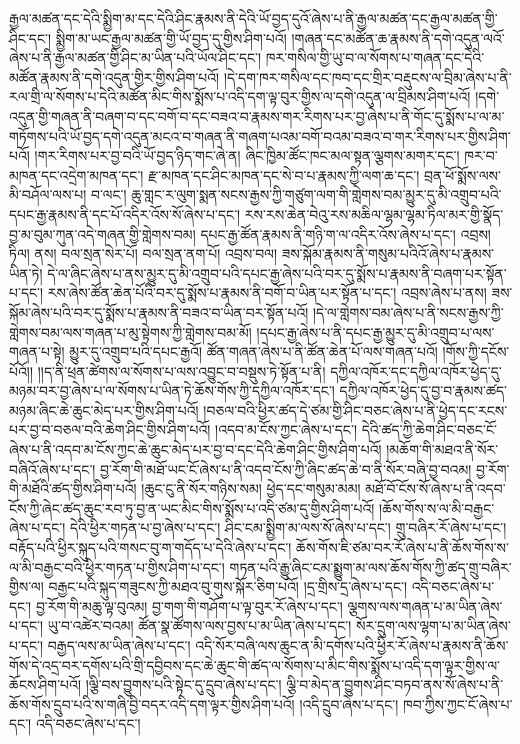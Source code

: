 རྒྱལ་མཚན་དང་དེའི་སྨྱིག་མ་དང་དེའི་ཤིང་རྣམས་ནི་དེའི་ཡོ་བྱད་དུའོ་ཞེས་པ་ནི་རྒྱལ་མཚན་དང་རྒྱལ་མཚན་གྱི་ཤིང་དང་། སྨྱིག་མ་ཡང་རྒྱལ་མཚན་གྱི་ཡོ་བྱད་དུ་གྱིས་ཤིག་པའོ། །གཞན་དང་མཚོན་ཆ་རྣམས་ནི་དགེ་འདུན་ལའོ་ཞེས་པ་ནི་རྒྱལ་མཚན་གྱི་ཤིང་མ་ཡིན་པའི་ཡོལ་ཤིང་དང་། ཁར་གསིལ་གྱི་ཡུ་བ་ལ་སོགས་པ་གཞན་དང་དེའི་མཚོན་རྣམས་ནི་དགེ་འདུན་གྱིར་གྱིས་ཤིག་པའོ། །དེ་དག་ཁར་གསིལ་དང་ཁབ་དང་གྲིར་བརྡུངས་ལ་བྲིམ་ཞེས་པ་ནི་རལ་གྲི་ལ་སོགས་པ་དེའི་མཚོན་མིང་གིས་སྨོས་པ་འདི་དག་ལྟ་བུར་གྱིས་ལ་དགེ་འདུན་ལ་བྲིམས་ཤིག་པའོ། །དགེ་འདུན་གྱི་གཞན་ནི་བཞག་བ་དང་བགོ་བ་དང་བཟའ་བ་རྣམས་གར་རིགས་པར་བྱ་ཞེས་པ་ནི་གོང་དུ་སྨོས་པ་ལ་མ་གཏོགས་པའི་ཡོ་བྱད་དགེ་འདུན་མངའ་བ་གཞན་ནི་གཞག་པའམ་བགོ་བའམ་བཟའ་བ་གར་རིགས་པར་གྱིས་ཤིག་པའོ། །གར་རིགས་པར་བྱ་བའི་ཡོ་བྱད་ཉིད་གང་ཞེ་ན། ཞིང་ཁྱིམ་ཚོང་ཁང་མལ་སྟན་ལྕགས་མགར་དང་། ཁར་བ་མཁན་དང་འདྲེག་མཁན་དང་། རྫ་མཁན་དང་ཤིང་མཁན་དང་སེ་བ་པ་རྣམས་ཀྱི་ལག་ཆ་དང་། བྲན་ཕོ་སྨོས་ལས་མི་བཤོལ་ལས་པ། བ་ལང་། ཆུ་གླང་ར་ལུག་སྨན་སངས་རྒྱས་ཀྱི་གཙུག་ལག་གི་གླེགས་བམ་མྱུར་དུ་མི་འགྲུབ་པའི་དཔང་རྒྱ་རྣམས་ནི་དང་པོ་འདིར་འོས་སོ་ཞེས་པ་དང་། རས་རས་ཆེན་བེའུ་རས་མཆིལ་ལྷམ་ལྷམ་ཏིལ་མར་གྱི་སྣོད་བྱ་མ་བུམ་ཀུན་འདེ་གཞན་གྱི་གླེགས་བམ། དཔང་རྒྱ་ཚོན་རྣམས་ནི་གཉི་ག་ལ་འདིར་འོས་ཞེས་པ་དང་། འབྲས། ཏིལ། ནས། བལ་སྲན་སེར་པོ། བལ་སྲན་ནག་པོ། འབྲས་བལ། ཟས་སྐོམ་རྣམས་ནི་གསུམ་པའིའོ་ཞེས་པ་རྣམས་ཡིན་ཏེ། དེ་ལ་ཞིང་ཞེས་པ་ནས་མྱུར་དུ་མི་འགྲུབ་པའི་དཔང་རྒྱ་ཞེས་པའི་བར་དུ་སྨོས་པ་རྣམས་ནི་བཞག་པར་སྟོན་པ་དང་། རས་ཞེས་ཚོན་ཆེན་པོའི་བར་དུ་སྨོས་པ་རྣམས་ནི་བགོ་བ་ཡིན་པར་སྟོན་པ་དང་། འབྲས་ཞེས་པ་ནས། ཟས་སྐོམ་ཞེས་པའི་བར་དུ་སྨོས་པ་རྣམས་ནི་བཟའ་བ་ཡིན་བར་སྟོན་པའོ། །དེ་ལ་གླེགས་བམ་ཞེས་པ་ནི་སངས་རྒྱས་ཀྱི་གླེགས་བམ་ལས་གཞན་པ་མུ་སྟེགས་ཀྱི་གླེགས་བམ་མོ། །དཔང་རྒྱ་ཞེས་པ་ནི་དཔང་རྒྱ་མྱུར་དུ་མི་འགྲུབ་པ་ལས་གཞན་པ་སྟེ། མྱུར་དུ་འགྲུབ་པའི་དཔང་རྒྱའོ། ཚོན་གཞན་ཞེས་པ་ནི་ཚོན་ཆེན་པོ་ལས་གཞན་པའོ། །གོས་ཀྱི་དངོས་པོའོ།། །།ད་ནི་ཕྲན་ཚེགས་ལ་སོགས་པ་ལས་འབྱུང་བ་བསྡུས་ཏེ་སྟོན་པ་ནི། དཀྱིལ་འཁོར་དང་དཀྱིལ་འཁོར་ཕྱེད་དུ་མཉམ་བར་བྱ་ཞེས་པ་ལ་སོགས་པ་ཡིན་ཏེ་ཆོས་གོས་ཀྱི་དཀྱིལ་འཁོར་དང་། དཀྱིལ་འཁོར་ཕྱེད་དུ་བྱ་བ་རྣམས་ཚད་མཉམ་ཞིང་ཆེ་ཆུང་མེད་པར་གྱིས་ཤིག་པའོ། །བཅལ་བའི་ཕྱིར་ཚད་དེ་ཙམ་གྱི་ཤིང་བཅང་ཞེས་པ་ནི་ཕྱེད་དང་རངས་པར་བྱ་བ་བཅལ་བའི་ཆེག་ཤིང་གྱིས་ཤིག་པའོ། །འདབ་མ་ངོས་ཀྱང་ཞེས་པ་དང་། དེའི་ཚད་ཀྱི་ཆེག་ཤིང་བཅང་ངོ་ཞེས་པ་ནི་འདབ་མ་ངོས་ཀྱང་ཆེ་ཆུང་མེད་པར་བྱ་བ་དང་དེའི་ཆེག་ཤིང་གྱིས་ཤིག་པའོ། །མཆོག་གི་མཐའ་ནི་སོར་བཞིའོ་ཞེས་པ་དང་། བྱ་རོག་གི་མཐོ་ཡང་ངོ་ཞེས་པ་ནི་འདབ་ངོས་ཀྱི་ཞིང་ཚད་ཆེ་བ་ནི་སོར་བཞི་བྱ་བའམ། བྱ་རོག་གི་མཐོའི་ཚད་གྱིས་ཤིག་པའོ། །ཆུང་ངུ་ནི་སོར་གཉིས་སམ། ཕྱེད་དང་གསུམ་མམ། མཐོ་བོ་ངོས་སོ་ཞེས་པ་ནི་འདབ་ངོས་ཀྱི་ཞེང་ཚད་ཆུང་རབ་ཏུ་བྱ་ན་ཡང་མིང་གིས་སྨོས་པ་འདི་ཙམ་དུ་གྱིས་ཤིག་པའོ། །ཆོས་གོས་ས་ལ་མི་བརྒྱང་ཞེས་པ་དང་། དེའི་ཕྱིར་གཏན་པ་བྱ་ཞེས་པ་དང་། ཤིང་ངམ་སྨྱིག་མ་ལས་སོ་ཞེས་པ་དང་། གྲུ་བཞིར་རོ་ཞེས་པ་དང་། བརྟོད་པའི་ཕྱིར་སྐུད་པའི་གསང་བུ་ག་གདོད་པ་དེའི་ཞེས་པ་དང་། ཆོས་གོས་ཇི་ཙམ་བར་རོ་ཞེས་པ་ནི་ཆོས་གོས་ས་ལ་མི་བརྒྱང་བའི་ཕྱིར་གཏན་པ་གྱིས་ཤིག་པ་དང་། གཏན་པའི་རྒྱུ་ཞིང་ངམ་སྨྱུག་མ་ལས་ཆོས་གོས་ཀྱི་ཚད་གྲུ་བཞིར་གྱིས་ལ། བརྒྱང་པའི་སྐུད་གཟུངས་ཀྱི་མཐའ་བུ་གུས་སྐོར་ཅིག་པའོ། །དྲ་གྲིས་དྲ་ཞེས་པ་དང་། འདི་བཅང་ཞེས་པ་དང་། བྱ་རོག་གི་མཆུ་ལྟ་བུའམ། བྱ་གག་གི་གཤོག་པ་ལྟ་བུར་རོ་ཞེས་པ་དང་། ལྕགས་ལས་གཞན་པ་མ་ཡིན་ཞེས་པ་དང་། ཡུ་བ་འཚེར་བའམ། ཚོན་སྣ་ཚོགས་ལས་བྱས་པ་མ་ཡིན་ཞེས་པ་དང་། སོར་དྲུག་ལས་ལྷག་པ་མ་ཡིན་ཞེས་པ་དང་། བརྒྱད་ལས་མ་ཡིན་ཞེས་པ་དང་། འདི་སོར་བཞི་ལས་ཆུང་ན་མི་དགོས་པའི་ཕྱིར་རོ་ཞེས་པ་རྣམས་ནི་ཆོས་གོས་དེ་འདྲ་བར་དགོས་པའི་གྲི་དབྱིབས་དང་ཆེ་ཆུང་གི་ཚད་ལ་སོགས་པ་མིང་གིས་སྨོས་པ་འདི་དག་ལྟར་གྱིས་ལ་ཆོངས་ཤིག་པའོ། །ལྕི་བས་བྱུགས་པའི་སྟེང་དུ་དྲུབ་ཞེས་པ་དང་། ལྕི་བ་མེད་ན་བྱུགས་ཤིང་བཏབ་ནས་སོ་ཞེས་པ་ནི་ཆོས་གོས་དྲུབ་པའི་ས་གཞི་བྱི་བདར་འདི་དག་ལྟར་གྱིས་ཤིག་པའོ། །འདི་དྲུབ་ཞེས་པ་དང་། ཁབ་ཀྱིས་ཀྱང་ངོ་ཞེས་པ་དང་། འདི་བཅང་ཞེས་པ་དང་། 